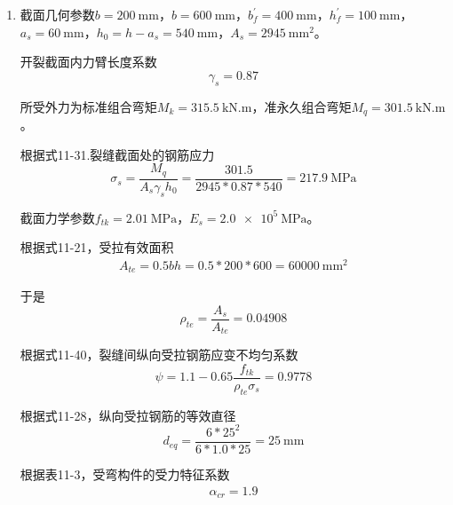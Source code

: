 \begin{enumerate}
          \begin{align*}
              \alpha_{cr} = 1.5 \times 1.66 \times 0.77 \times 1.0 = 1.9
          \end{align*}
          \par 根据式11-27，最大裂缝宽度
          \begin{align*}
              w_{max} & = \alpha_{cr} \psi \frac{\sigma_s}{E_s} (1.9 c + 0.08 \frac{d_{eq}}{\rho_{te}}) \\
                      & = 1.9 * 0.8088 * 148.2 / 200000 * (1.9 * 25 + 0.08 * 16 / 0.02681)              \\
                      & = \SI{0.1084}{\mm}
          \end{align*}
          \par 题中没有给出最大裂缝宽度限值或结构构件的裂缝控制等级，但对于钢筋混凝土结构，无论是一类还是二类或三类，$w_{max}=\SI{0.1084}{\mm}$都能满足\gb{}的要求。
    \item 截面几何参数$b=\SI{200}{\mm}$，$b=\SI{600}{\mm}$，$b_f^\prime=\SI{400}{\mm}$，$h_f^\prime=\SI{100}{\mm}$，$a_s=\SI{60}{\mm}$，$h_0=h-a_s=\SI{540}{\mm}$，$A_s=\SI{2945}{\mm^2}$。
          \par 开裂截面内力臂长度系数
          $$\gamma_s = 0.87$$
          \par 所受外力为标准组合弯矩$M_k=\SI{315.5}{\kN.\m}$，准永久组合弯矩$M_q=\SI{301.5}{\kN.\m}$。
          \par 根据式11-31.裂缝截面处的钢筋应力
          $$\sigma_s = \frac{M_q}{A_s\gamma_sh_0} = \frac{301.5}{2945*0.87*540}=\SI{217.9}{\MPa}$$
          \par 截面力学参数$f_{tk}=\SI{2.01}{\MPa}$，$E_s=\SI{2.0e5}{\MPa}$。
          \par 根据式11-21，受拉有效面积
          \begin{align*}
              A_{te} = 0.5bh = 0.5*200*600 = \SI{60000}{\mm^2}
          \end{align*}
          \par 于是
          $$\rho_{te}=\frac{A_s}{A_{te}}=0.04908$$
          \par 根据式11-40，裂缝间纵向受拉钢筋应变不均匀系数
          $$\psi = 1.1 - 0.65 \frac{f_{tk}}{\rho_{te}\sigma_s} = 0.9778$$
          \par 根据式11-28，纵向受拉钢筋的等效直径
          $$d_{eq}=\frac{6*25^2}{6*1.0*25}=\SI{25}{\mm}$$
          \par 根据表11-3，受弯构件的受力特征系数
          \begin{align*}
              \alpha_{cr} = 1.9

\end{align*}
\end{enumerate}
